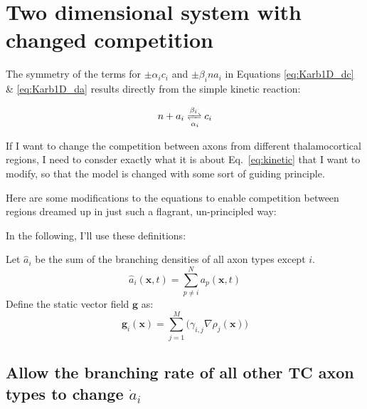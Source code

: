 \documentclass[11pt, a4paper]{article}
\newcommand{\mb}[1]{\mathbf{#1}} %
\begin{document}
\section{Two dimensional system with changed competition}

The symmetry of the terms for $\pm \alpha_i c_i$ and
$\pm \beta_i n a_i$ in
Equations \ref{eq:Karb1D_dc} \& \ref{eq:Karb1D_da} results directly
from the simple kinetic reaction:

\begin{equation} \label{eq:kinetic}
n + a_i \xrightleftharpoons[\alpha_{i}]{\beta_{i}} c_i
\end{equation}

If I want to change the competition between axons from different
thalamocortical regions, I need to consder exactly what it is about
Eq.~\ref{eq:kinetic} that I want to modify, so that the model is
changed with some sort of guiding principle.

Here are some modifications to the equations to enable competition
between regions dreamed up in just such a flagrant, un-principled way:

In the following, I'll use these definitions:

Let $\hat{a}_i$ be the sum of the branching densities of all axon
types except $i$.
%
\begin{equation}
\hat{a}_i(\mb{x},t) = \sum_{p\ne i}^N a_p(\mb{x},t)
\end{equation}
%
Define the static vector field $\mb{g}$ as:
%
\begin{equation} \label{eq:g_i}
\mb{g}_i(\mb{x}) = \sum_{j=1}^M \big(\gamma_{i,j} \nabla\rho_j(\mb{x}) \big)
\end{equation}

\subsection{Allow the branching rate of all other TC axon types to change $\dot{a}_i$}
\label{sec:comp1}
\end{document}
